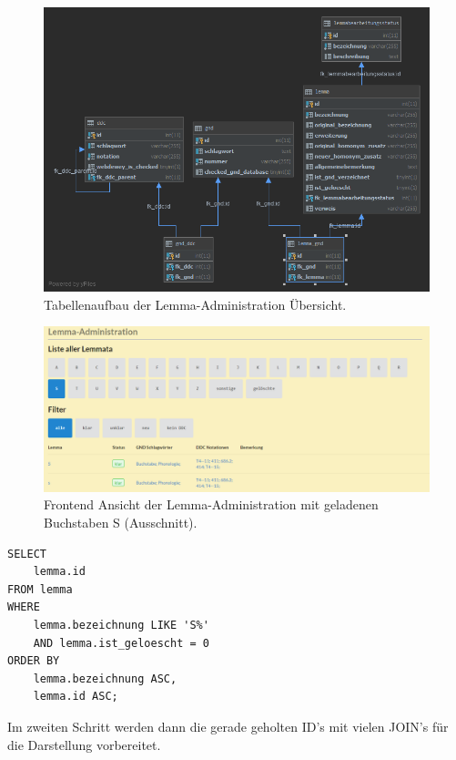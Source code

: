 \begin{figure}
	\centering
	\includegraphics[width=0.8\linewidth]{images/structure_lemmaadministration.png}
	\caption{Tabellenaufbau der Lemma-Administration Übersicht.}
	\label{img:lAdminStructure}
\end{figure}

\begin{figure}
	\centering
	\includegraphics[width=1\linewidth]{images/lemmaadministration_sample.PNG}
	\caption{Frontend Ansicht der Lemma-Administration mit geladenen Buchstaben S (Ausschnitt).}
	\label{img:lAdminSample}
\end{figure}

\lstset{language=SQL}
\begin{lstlisting}[frame=single] 
    SELECT
    lemma.id
FROM lemma
WHERE
    lemma.bezeichnung LIKE 'S%'
    AND lemma.ist_geloescht = 0
ORDER BY
    lemma.bezeichnung ASC,
    lemma.id ASC;
\end{lstlisting}

Im zweiten Schritt werden dann die gerade geholten ID’s mit vielen JOIN's für die Darstellung vorbereitet.

